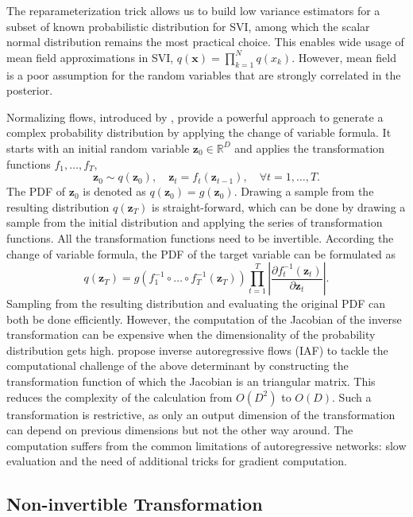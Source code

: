 \documentclass[twoside]{article}
\newcommand{\xV}{\mathbf{x}}
\newcommand{\R}{\mathbb{R}}
\newcommand{\zV}{\mathbf{z}}
\begin{document}
The reparameterization trick allows us to build low variance estimators for a subset of known probabilistic distribution for SVI, among which the scalar normal distribution remains the most practical choice. This enables wide usage of mean field approximations in SVI, $q(\xV) = \prod_{k=1}^N q(x_k)$. However, mean field is a poor assumption for the random variables that are strongly correlated in the posterior. 

Normalizing flows, introduced by \cite{JimenezRezendeMohamed2015}, provide a powerful approach to generate a complex probability distribution by applying the change of variable formula. It starts with an initial random variable $\zV_0 \in \R^D$ and applies the transformation functions $f_1, \ldots, f_T$, 
$$
\zV_0 \sim q(\zV_0), \quad  \zV_t = f_t(\zV_{t-1}),\quad \forall t=1,\ldots, T.
$$
The PDF of $\zV_0$ is denoted as $q(\zV_0)=g(\zV_0)$. Drawing a sample from the resulting distribution $q(\zV_T)$ is straight-forward, which can be done by drawing a sample from the initial distribution and applying the series of transformation functions.
%
All the transformation functions need to be invertible. According the change of variable formula, the PDF of the target variable can be formulated as
\begin{equation}
q(\zV_T) = g(f_1^{-1} \circ \ldots \circ f_T^{-1}(\zV_T)) \prod_{t=1}^T \left| \frac{\partial f_t^{-1}(\zV_t)}{\partial \zV_t}\right|. \label{eqn:nf_pdf}
\end{equation}
%
Sampling from the resulting distribution and evaluating the original PDF can both be done efficiently. However, the computation of the Jacobian of the inverse transformation can be expensive when the dimensionality of the probability distribution gets high. \cite{KingmaEtAl2016}  propose inverse autoregressive flows (IAF) to tackle the computational challenge of the above determinant by constructing the transformation function of which the Jacobian is an triangular matrix. This reduces the complexity of the calculation from $O(D^2)$ to $O(D)$. Such a transformation is restrictive, as only an output dimension of the transformation can depend on previous dimensions but not the other way around. The computation suffers from the common limitations of autoregressive networks: slow evaluation and the need of additional tricks for gradient computation.

\subsection{Non-invertible Transformation}
\end{document}
